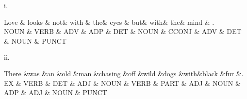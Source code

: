 i. \\
\begin{center}
{
    \begin{dependency}
        \begin{deptext}
            Love \& looks \& not\&  with \& the\&  eyes \& but\&  with\&  the\&  mind  \& .   \\
            NOUN \& VERB \& ADV \& ADP \& DET    \& NOUN \& CCONJ    \& ADV    \& DET \& NOUN  \& PUNCT \\
        \end{deptext}
    \end{dependency}
}
\end{center}

ii. \\
\begin{center}
{
    \begin{dependency}
        \begin{deptext}
            There \&was \&an \&old \&man \&chasing \&off \&wild \&dogs \&with\&black \&fur \&.     \\
            EX \& VERB  \& DET \& ADJ \& NOUN \& VERB \& PART \& ADJ \& NOUN   \& ADP   \& ADJ  \& NOUN  \& PUNCT \\
        \end{deptext}
    \end{dependency}
}
\end{center}

